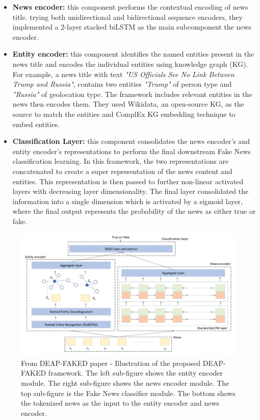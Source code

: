\documentclass[10pt, english]{report}
\begin{document}
\begin{itemize}
\item \textbf{News encoder:} this component performs the contextual encoding of news title. trying both unidirectional and bidirectional sequence encoders, they implemented a 2-layer stacked biLSTM as the main subcomponent the news encoder.
\item \textbf{Entity encoder:} this component identifies the named entities present in the news title and encodes the individual entities using knowledge graph (KG).
For example, a news title with text \textit{"US Officials See No Link Between Trump and Russia"}, contains two entities \textit{"Trump"} of person type and \textit{"Russia"} of geolocation type.
The framework includes relevant entities in the news then encodes them. They used Wikidata, an open-source KG, as the source to match the entities and ComplEx KG embedding technique to embed entities.
\item \textbf{Classification Layer:} this component consolidates the news encoder's and entity encoder's representations to perform the final downstream Fake News classification learning.
In this framework, the two representations are concatenated to create a super representation of the news content and entities. This representation is then passed to further non-linear activated layers with decreasing layer dimensionality. The final layer consolidated the information into a single dimension which is activated by a sigmoid layer, where the final output represents the probability of the news as either true or fake.
\end{itemize}

\begin{figure}[H]
	\centering
	\includegraphics[scale=0.45]{img/deap_fake_framework.png}
	\caption{From DEAP-FAKED paper - Illustration of the proposed DEAP-FAKED framework. The left sub-figure shows the entity encoder module. The right sub-figure shows the news encoder module. The top sub-figure is the Fake News classifier module. The bottom shows the tokenized news as the input to the entity encoder and news encoder.}
\end{figure}
\end{document}
